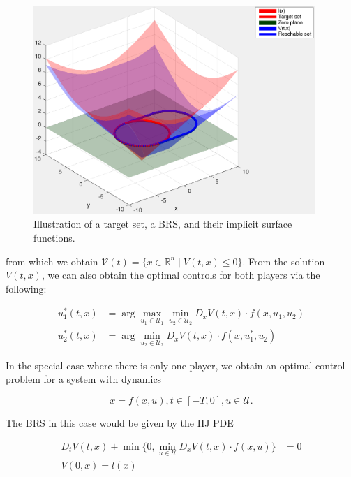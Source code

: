 \begin{figure}
	\centering
	\includegraphics[width=0.95\textwidth]{"fig/RSExample"}
	\caption{Illustration of a target set, a BRS, and their implicit surface functions.}
	\label{fig:RSExample}
\end{figure}

\noindent from which we obtain $\mathcal{V}(t) = \{x\in\mathbb{R}^n \mid V(t,x)\le 0\}$. From the solution $V(t,x)$, we can also obtain the optimal controls for both players via the following:

\begin{equation} \label{eq:HJI_ctrl_syn}
\begin{aligned}
u_1^*(t,x) &= \arg \max_{u_1\in\mathcal{U}_1} \min_{u_2\in\mathcal U_2} D_x V(t,x) \cdot f(x,u_1,u_2)\\
u_2^*(t,x) &= \arg \min_{u_2\in\mathcal{U}_2} D_x V(t,x) \cdot f(x,u_1^*,u_2)
\end{aligned}
\end{equation}

In the special case where there is only one player, we obtain an optimal control problem for a system with dynamics

\begin{equation} \label{eq:dyn_d}
\dot{x} = f(x, u), t\in [-T,0], u\in\mathcal U.
\end{equation}

The BRS in this case would be given by the HJ PDE

\begin{equation} \label{eq:HJBPDE}
\begin{aligned}
D_t V(t,x) + \min \{0, \min_{u\in\mathcal{U}} D_x V(t,x) \cdot f(x,u)\} &= 0 \\
V(0,x) = l(x)&
\end{aligned}
\end{equation}

